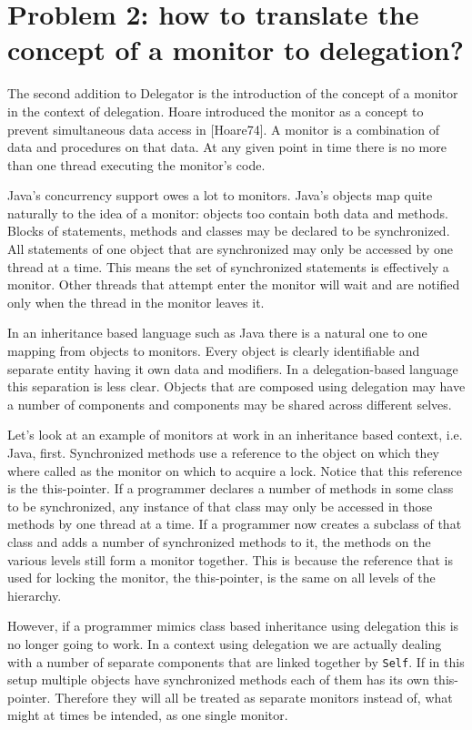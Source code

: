 \documentclass[a4paper,12pt]{book}
\begin{document}
\section*{Problem 2: how to translate the concept of a monitor to delegation?}
The second addition to Delegator is the introduction of the concept of a monitor in the context of delegation. Hoare introduced the monitor as a concept to prevent simultaneous data access in [Hoare74]. A monitor is a combination of data and procedures on that data. At any given point in time there is no more than one thread executing the monitor's code. 

Java's concurrency support owes a lot to monitors. Java's objects map quite naturally to the idea of a monitor: objects too contain both data and methods. Blocks of statements, methods and classes may be declared to be synchronized. All statements of one object that are synchronized may only be accessed by one thread at a time. This means the set of synchronized statements is effectively a monitor. Other threads that attempt enter the monitor will wait and are notified only when the thread in the monitor leaves it.

In an inheritance based language such as Java there is a natural one to one mapping from objects to monitors. Every object is clearly identifiable and separate entity having it own data and modifiers. In a delegation-based language this separation is less clear. Objects that are composed using delegation may have a number of components and components may be shared across different selves.  

Let's look at an example of monitors at work in an inheritance based context, i.e. Java, first. Synchronized methods use a reference to the object on which they where called as the monitor on which to acquire a lock. Notice that this reference is the this-pointer. If a programmer declares a number of methods in some class to be synchronized, any instance of that class may only be accessed in those methods by one thread at a time. If a programmer now creates a subclass of that class and adds a number of synchronized methods to it, the methods on the various levels still form a monitor together. This is because the reference that is used for locking the monitor, the this-pointer, is the same on all levels of the hierarchy.

However, if a programmer mimics class based inheritance using delegation this is no longer going to work. In a context using delegation we are actually dealing with a number of separate components that are linked together by \verb|Self|. If in this setup multiple objects have synchronized methods each of them has its own this-pointer. Therefore they will all be treated as separate monitors instead of, what might at times be intended, as one single monitor.
\end{document}
